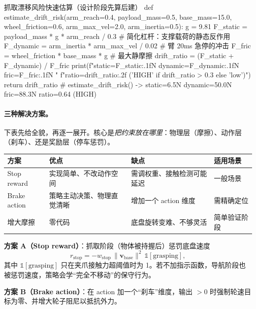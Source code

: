 \begin{codebox}[Python]{抓取漂移风险快速估算（设计阶段先算后建）}
def estimate_drift_risk(arm_reach=0.4, payload_mass=0.5, base_mass=15.0,
                        wheel_friction=0.6, arm_max_vel=2.0, arm_inertia=0.5):
    g = 9.81
    F_static  = payload_mass * g * arm_reach / 0.3   # 简化杠杆：支撑载荷的静态反作用
    F_dynamic = arm_inertia * arm_max_vel / 0.02     # 臂 20ms 急停的冲击
    F_fric    = wheel_friction * base_mass * g        # 最大静摩擦
    drift_ratio = (F_static + F_dynamic) / F_fric
    print(f"static={F_static:.1f}N dynamic={F_dynamic:.1f}N fric={F_fric:.1f}N "
          f"ratio={drift_ratio:.2f} ({'HIGH' if drift_ratio > 0.3 else 'low'})")
    return drift_ratio
# estimate_drift_risk()  ->  static=6.5N dynamic=50.0N fric=88.3N ratio=0.64 (HIGH)
\end{codebox}

\paragraph{三种解决方案。}下表先给全貌，再逐一展开。核心是\emph{把约束放在哪里}：物理层（摩擦）、动作层（刹车）、还是奖励层（停车惩罚）。

\begin{center}
\small
\begin{tabular}{@{}llll@{}}
\toprule
方案 & 优点 & 缺点 & 适用场景 \\
\midrule
Stop reward & 实现简单、不改动作空间 & 需调权重、接触检测可能延迟 & 一般场景 \\
Brake action & 策略主动决策、物理直觉清晰 & 增加一个 action 维度 & 需精确定位 \\
增大摩擦 & 零代码 & 底盘旋转变难、不够灵活 & 简单验证阶段 \\
\bottomrule
\end{tabular}
\end{center}

\textbf{方案 A（Stop reward）}：抓取阶段（物体被持握后）惩罚底盘速度
\begin{equation}
r_{\text{stop}}=-w_{\text{stop}}\,\lVert \mathbf{v}_{\text{base}}\rVert^2\,\mathbb{1}[\text{grasping}],
\label{eq:rlmc-wh-stop}
\end{equation}
其中 $\mathbb{1}[\text{grasping}]$ 只在夹爪接触力超阈值时为 1。若不加指示函数，导航阶段也被惩罚速度，策略会学“完全不移动”的保守行为。

\textbf{方案 B（Brake action）}：在 action 加一个“刹车”维度，输出 $>0$ 时强制轮速目标为零、并增大轮子阻尼以抵抗外力。

